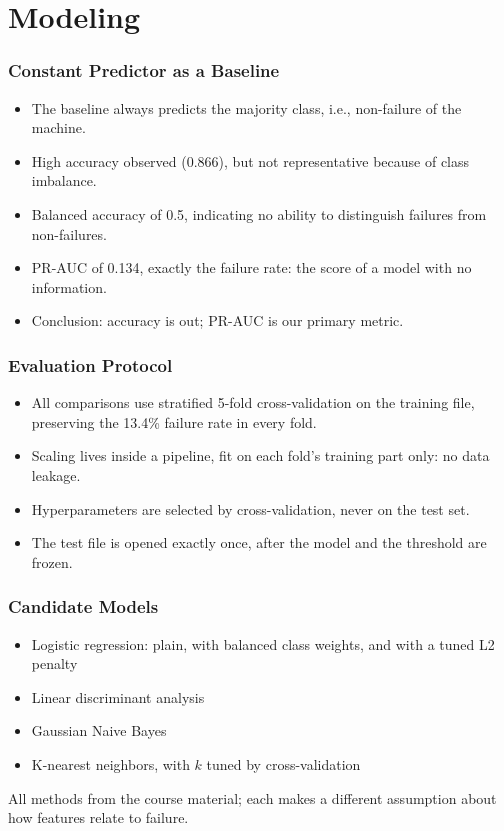 \documentclass{beamer}
\begin{document}
    \section{Modeling}
    \begin{frame}
        \frametitle{Constant Predictor as a Baseline}
        \begin{itemize}
            \item The baseline always predicts the majority class, i.e., non-failure of the machine.
            \item High accuracy observed (0.866), but not representative because of class imbalance.
            \item Balanced accuracy of 0.5, indicating no ability to distinguish failures from non-failures.
            \item PR-AUC of 0.134, exactly the failure rate: the score of a model with no information.
            \item Conclusion: accuracy is out; PR-AUC is our primary metric.
        \end{itemize}
    \end{frame}
    \begin{frame}
        \frametitle{Evaluation Protocol}
        \begin{itemize}
            \item All comparisons use stratified 5-fold cross-validation on the training file, preserving the 13.4\% failure rate in every fold.
            \item Scaling lives inside a pipeline, fit on each fold's training part only: no data leakage.
            \item Hyperparameters are selected by cross-validation, never on the test set.
            \item The test file is opened exactly once, after the model and the threshold are frozen.
        \end{itemize}
    \end{frame}
    \begin{frame}
        \frametitle{Candidate Models}
        \begin{itemize}
            \item Logistic regression: plain, with balanced class weights, and with a tuned L2 penalty
            \item Linear discriminant analysis
            \item Gaussian Naive Bayes
            \item K-nearest neighbors, with $k$ tuned by cross-validation
        \end{itemize}
        \vspace{0.5em}
        All methods from the course material; each makes a different assumption about how features relate to failure.
    \end{frame}
\end{document}
